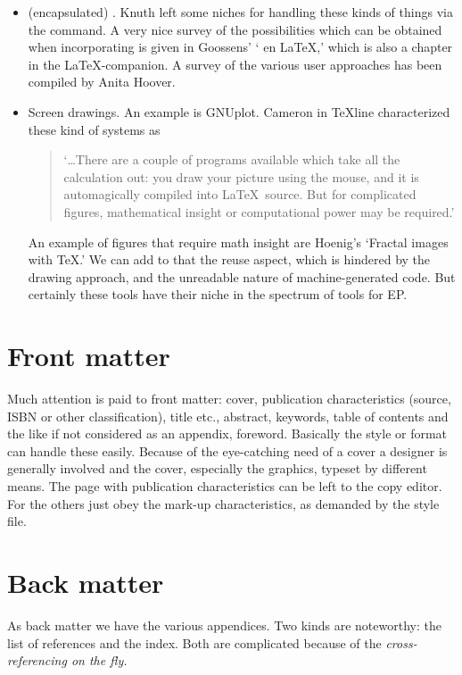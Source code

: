\begin{itemize}
\item (encapsulated) \PS. Knuth left some niches for handling these
  kinds of things via the  command. A very nice survey of
  the possibilities which can be obtained when incorporating \PS{} is
  given in Goossens' `\PS{} en \LaTeX,' which is also a chapter in
  the \LaTeX-companion. A survey of the various user approaches has been
  compiled by Anita Hoover.
\item Screen drawings. An example is GNUplot. Cameron in \TeX line
  characterized these kind of systems as
\begin{quote}
  `\ldots There are a couple of programs available which take all the
  calculation out: you draw your picture using the mouse, and it is
  automagically compiled into \LaTeX\ source. But for complicated
  figures, mathematical insight or computational power may be required.'
\end{quote}
  An example of figures that require math insight are Hoenig's `Fractal
  images with \TeX.'
  We can add to that the reuse aspect, which is hindered by the drawing
  approach, and the unreadable nature of  machine-generated code.
  But certainly these tools have their niche in the spectrum of tools for EP.
\end{itemize}

\section{Front matter}
Much attention is paid to front matter:
cover,
publication characteristics (source, ISBN or other classification),
title etc.,
abstract,
keywords,
table of contents and the like if not considered as an appendix,
foreword.
Basically the style or format can handle these easily.
Because of the eye-catching need of a cover a designer
is generally involved and the cover, especially
the graphics, typeset by different means.
The page with publication characteristics  can be left to
the copy editor.
For the others just obey the mark-up characteristics, as demanded
by the style file.
\section{Back matter}
As back matter we have the various appendices. Two kinds are
noteworthy: the list of references and the index. Both are
complicated because of the {\em cross-referencing on the fly.}
